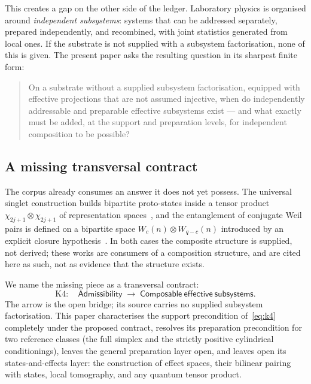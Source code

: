 \documentclass[11pt,a4paper]{article}
\begin{document}
    This creates a gap on the other side of the ledger.
    Laboratory physics is organised around \emph{independent subsystems}: systems that can be addressed
    separately, prepared independently, and recombined, with joint statistics generated from local ones.
    If the substrate is not supplied with a subsystem factorisation, none of this is given.
    The present paper asks the resulting question in its sharpest finite form:

    \begin{quote}
      On a substrate without a supplied subsystem factorisation, equipped with effective projections that
      are not assumed injective, when do independently addressable and preparable effective subsystems exist
      --- and what exactly must be added, at the support and preparation levels, for independent composition
      to be possible?
    \end{quote}

  \subsection{A missing transversal contract}
    \label{ssec:k4}

    The corpus already consumes an answer it does not yet possess.
    The universal singlet construction builds bipartite proto-states inside a tensor product
    $\chi_{2j+1} \otimes \chi_{2j+1}$ of representation spaces~\cite{Beau2026q3}, and the entanglement of
    conjugate Weil pairs is defined on a bipartite space $W_c(n) \otimes W_{q-c}(n)$ introduced by an explicit
    closure hypothesis~\cite{Beau2026entnote}.
    In both cases the composite structure is supplied, not derived; these works are consumers of a
    composition structure, and are cited here as such, not as evidence that the structure exists.

    We name the missing piece as a transversal contract:
    \begin{equation}
      \label{eq:k4}
      \mathrm{K4}\colon\quad
      \mathsf{Admissibility}
      \;\longrightarrow\;
      \mathsf{Composable\ effective\ subsystems}.
    \end{equation}
    The arrow is the open bridge; its source carries no supplied subsystem factorisation.
    This paper characterises the support precondition of~\eqref{eq:k4} completely under the proposed
    contract, resolves its preparation precondition for two reference classes (the full simplex and the
    strictly positive cylindrical conditionings), leaves the general preparation layer open, and leaves
    open its states-and-effects layer: the construction of effect spaces, their bilinear pairing
    with states, local tomography, and any quantum tensor product.
\end{document}
